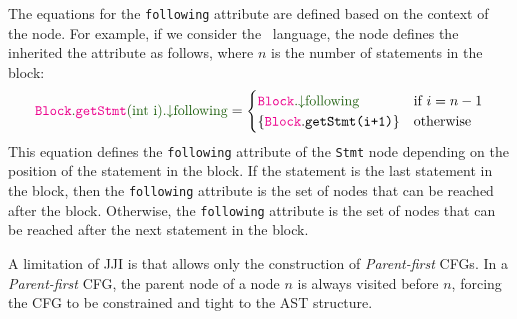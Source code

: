 The equations for the \texttt{following} attribute are defined based on the context 
of the node. For example, if we consider the \bnc\ language, the  node
defines the inherited the attribute  as follows, where $n$ is the
number of statements in the block:
\begin{align}
    \Ainhindex{Block}{getStmt}{int i}{following} = \begin{cases}
        \Ainh{Block}{following} & \text{if } i=n-1\\
        \{\astnode{Block}.\code{getStmt(i+1)}\} & \text{otherwise}
    \end{cases}
\end{align}
This equation defines the \texttt{following} attribute of the \texttt{Stmt} node 
depending on the position of the statement in the block. If the statement
is the last statement in the block, then the \texttt{following} attribute is
the set of nodes that can be reached after the block. Otherwise, the \texttt{following}
attribute is the set of nodes that can be reached after the next statement in the block.





A limitation of JJI is that allows only the construction of \emph{Parent-first} CFGs.
In a \emph{Parent-first} CFG, the parent node of a node $n$ is always visited before $n$, 
forcing the CFG to be constrained and tight to the AST structure.




